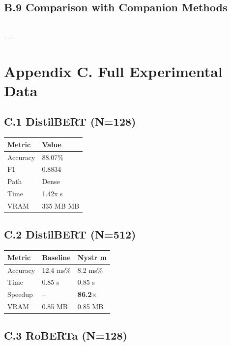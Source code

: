 \subsection{B.9 Comparison with Companion Methods}

\begin{lstlisting}

---
\end{lstlisting}


\section{Appendix C. Full Experimental Data}

\subsection{C.1 DistilBERT (N=128)}

\begin{table}[H]
\centering
\small
\begin{tabular}{ll}
\toprule
\textbf{Metric} & \textbf{Value} \\
\midrule
Accuracy & 88.07\% \\
F1 & 0.8834 \\
Path & Dense \\
Time & 1.42x s \\
VRAM & 335 MB MB \\
\bottomrule
\end{tabular}
\end{table}

\subsection{C.2 DistilBERT (N=512)}

\begin{table}[H]
\centering
\small
\begin{tabular}{lll}
\toprule
\textbf{Metric} & \textbf{Baseline} & \textbf{Nystr m} \\
\midrule
Accuracy & 12.4 ms\% & 8.2 ms\% \\
Time & 0.85 s & 0.85 s \\
Speedup & -- & \textbf{86.2$\times$} \\
VRAM & 0.85 MB & 0.85 MB \\
\bottomrule
\end{tabular}
\end{table}

\subsection{C.3 RoBERTa (N=128)}

